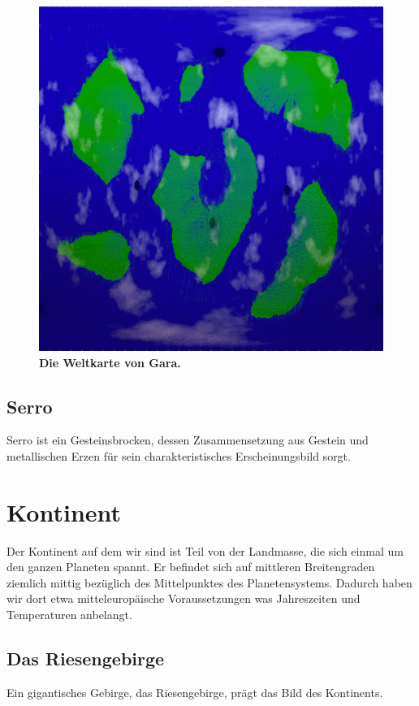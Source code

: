 \begin{figure}[tbh]
	\centering
	\includegraphics[width=0.7\linewidth]{Abbildungen/Weltenbau/Welt/gara-map}
	\caption[Weltkarte von Gara]{\textbf{Die Weltkarte von Gara.}}
	\label{fig:gara-map}
\end{figure}


\subsection{Serro} \label{sec:mond}
Serro ist ein Gesteinsbrocken, dessen Zusammensetzung aus Gestein und metallischen Erzen für sein charakteristisches Erscheinungsbild sorgt.



\section{Kontinent}
Der Kontinent auf dem wir sind ist Teil von der Landmasse, die sich einmal um den ganzen Planeten spannt.
Er befindet sich auf mittleren Breitengraden ziemlich mittig bezüglich des Mittelpunktes des Planetensystems.
Dadurch haben wir dort etwa mitteleuropäische Voraussetzungen was Jahreszeiten und Temperaturen anbelangt.

\subsection{Das Riesengebirge}
Ein gigantisches Gebirge, das Riesengebirge, prägt das Bild des Kontinents.

